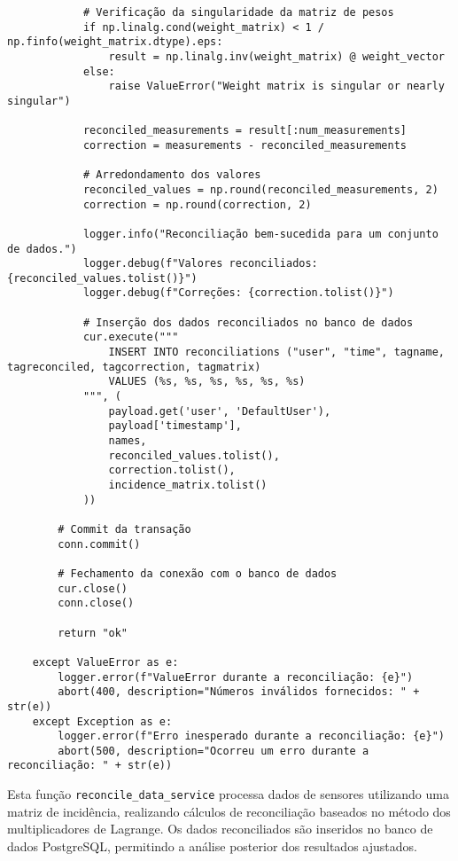 \begin{verbatim}
            # Verificação da singularidade da matriz de pesos
            if np.linalg.cond(weight_matrix) < 1 / np.finfo(weight_matrix.dtype).eps:
                result = np.linalg.inv(weight_matrix) @ weight_vector
            else:
                raise ValueError("Weight matrix is singular or nearly singular")

            reconciled_measurements = result[:num_measurements]
            correction = measurements - reconciled_measurements

            # Arredondamento dos valores
            reconciled_values = np.round(reconciled_measurements, 2)
            correction = np.round(correction, 2)

            logger.info("Reconciliação bem-sucedida para um conjunto de dados.")
            logger.debug(f"Valores reconciliados: {reconciled_values.tolist()}")
            logger.debug(f"Correções: {correction.tolist()}")

            # Inserção dos dados reconciliados no banco de dados
            cur.execute("""
                INSERT INTO reconciliations ("user", "time", tagname, tagreconciled, tagcorrection, tagmatrix)
                VALUES (%s, %s, %s, %s, %s, %s)
            """, (
                payload.get('user', 'DefaultUser'),
                payload['timestamp'],
                names,
                reconciled_values.tolist(),
                correction.tolist(),
                incidence_matrix.tolist()
            ))

        # Commit da transação
        conn.commit()

        # Fechamento da conexão com o banco de dados
        cur.close()
        conn.close()

        return "ok"

    except ValueError as e:
        logger.error(f"ValueError durante a reconciliação: {e}")
        abort(400, description="Números inválidos fornecidos: " + str(e))
    except Exception as e:
        logger.error(f"Erro inesperado durante a reconciliação: {e}")
        abort(500, description="Ocorreu um erro durante a reconciliação: " + str(e))
\end{verbatim}

Esta função \texttt{reconcile\_data\_service} processa dados de sensores utilizando uma matriz de incidência, realizando cálculos de reconciliação baseados no método dos multiplicadores de Lagrange. Os dados reconciliados são inseridos no banco de dados PostgreSQL, permitindo a análise posterior dos resultados ajustados.
